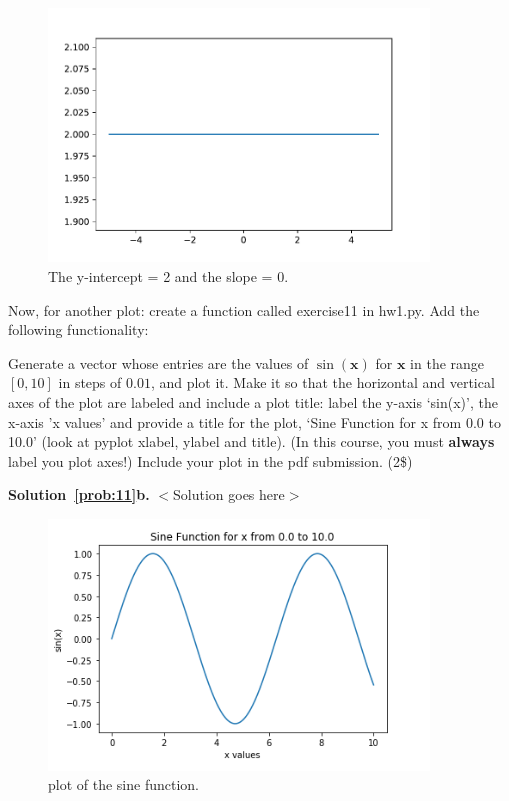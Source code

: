 \documentclass[10pt]{article}
\begin{document}
\begin{enumerate}
\begin{figure}
\centering
\includegraphics[width=0.9\textwidth]{line_plot3.pdf}
\caption{\label{fig:plot3}The y-intercept = 2 and the slope = 0.}
\end{figure}

Now, for another plot: create a function called exercise11 in hw1.py.  Add the following functionality:

Generate a vector whose entries are the values of $\sin(\mathbf{x})$ for $\mathbf{x}$ in the range $[0,10]$ in steps of $0.01$, and plot it.  Make it so that the horizontal and vertical axes of the plot are labeled and include a plot title: label the y-axis `sin(x)', the x-axis 'x values' and provide a title for the plot, `Sine Function for x from 0.0 to 10.0' (look at pyplot xlabel, ylabel and title).  (In this course, you must {\bf always} label you plot axes!)  Include your plot in the pdf submission. (2\$)

{\bf Solution~\ref{prob:11}b.} $<$Solution goes here$>$\\

\begin{figure}
\centering
\includegraphics[width=0.9\textwidth]{sin_plot.png}
\caption{\label{fig:sinePlot}plot of the sine function.}
\end{figure}

\end{enumerate}
\end{document}
